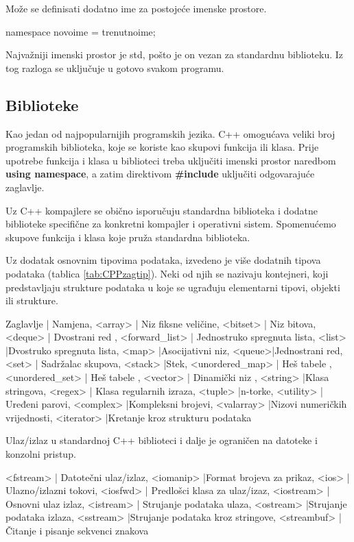 \documentclass[11pt]{book}
\begin{document}
Može se definisati dodatno ime za postojeće imenske prostore.

\begin{shortlisting}
  namespace novoime = trenutnoime;
\end{shortlisting}

Najvažniji imenski prostor je std, pošto je on vezan za standardnu biblioteku. Iz tog razloga se uključuje u gotovo svakom programu.

\subsection{Biblioteke}
Kao jedan od najpopularnijih programskih jezika. C++ omogućava veliki broj programskih biblioteka, koje se koriste kao skupovi funkcija ili klasa. Prije upotrebe funkcija i klasa u biblioteci treba uključiti imenski prostor naredbom \textbf{using namespace}, a zatim direktivom \textbf{\#include} uključiti odgovarajuće zaglavlje.

Uz C++ kompajlere se obično isporučuju standardna biblioteka i dodatne biblioteke  specifične za konkretni kompajler i operativni sistem. Spomenućemo skupove funkcija i klasa koje pruža standardna biblioteka.

Uz dodatak osnovnim tipovima podataka, izvedeno je više dodatnih tipova podataka (tablica \ref{tab:CPPzagtip}). Neki od njih se nazivaju kontejneri, koji predstavljaju strukture podataka u koje se ugrađuju elementarni tipovi, objekti ili strukture.

{
  Zaglavlje | Namjena,
  <array> | Niz fiksne veličine,
  <bitset> | Niz bitova,
  <deque> | Dvostrani red ,
  <forward\_list> | Jednostruko spregnuta lista,
  <list> |Dvostruko spregnuta lista,
  <map>  |Asocijativni niz,
  <queue>|Jednostrani red,
  <set> | Sadržalac skupova,
  <stack> |Stek,
  <unordered\_map> | Heš tabele  ,
  <unordered\_set> | Heš tabele ,
  <vector>  | Dinamički niz ,
  <string> |Klasa stringova,
  <regex> | Klasa regularnih izraza,
  <tuple> |n-torke,
  <utility> | Uređeni parovi,
  <complex> |Kompleksni brojevi,
  <valarray> |Nizovi numeričkih vrijednosti,
  <iterator> |Kretanje kroz strukturu podataka
}

Ulaz/izlaz u standardnoj C++ biblioteci i dalje je ograničen na datoteke i konzolni pristup.

{
  <fstream> | Datotečni ulaz/izlaz,
  <iomanip> |Format brojeva za prikaz,
  <ios> | Ulazno/izlazni tokovi,
  <iosfwd> | Predlošci klasa za ulaz/izaz,
  <iostream> | Osnovni ulaz izlaz,
  <istream> | Strujanje podataka ulaza,
  <ostream> |Strujanje podataka izlaza,
  <sstream> |Strujanje podataka kroz stringove,
  <streambuf> | Čitanje i pisanje sekvenci znakova
}
\end{document}
